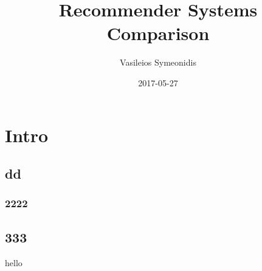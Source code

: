 \documentclass{article}
\title{Recommender Systems Comparison}
\date{2017-05-27}
\author{Vasileios Symeonidis}
\begin{document}
\maketitle
\tableofcontents
{}
\newpage
{}

\section{Intro}
\cite{DUMMY:1}
\subsection{dd}
\subsubsection{2222}
\subsection{333}
hello


\newpage


\end{document}
